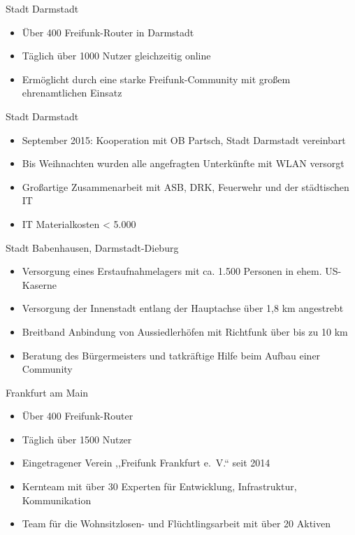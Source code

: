 \documentclass[t]{beamer}
\begin{document}
  \begin{frame}{Stadt Darmstadt}
    \begin{itemize}
      \item Über 400 Freifunk-Router in Darmstadt
      \item Täglich über 1000 Nutzer gleichzeitig online
      \item Ermöglicht durch eine starke Freifunk-Community mit großem ehrenamtlichen Einsatz
    \end{itemize}
  \end{frame}

  \begin{frame}{Stadt Darmstadt}
    \begin{itemize}
      \item September 2015: Kooperation mit OB Partsch, Stadt Darmstadt vereinbart
      \item Bis Weihnachten wurden alle angefragten Unterkünfte mit WLAN versorgt
      \item Großartige Zusammenarbeit mit ASB, DRK, Feuerwehr und der städtischen IT
      \item IT Materialkosten < 5.000 \texteuro
    \end{itemize}
  \end{frame}

  \begin{frame}{Stadt Babenhausen, Darmstadt-Dieburg}
    \begin{itemize}
      \item Versorgung eines Erstaufnahmelagers mit ca. 1.500 Personen in ehem. US-Kaserne
      \item Versorgung der Innenstadt entlang der Hauptachse über 1,8 km angestrebt
      \item Breitband Anbindung von Aussiedlerhöfen mit Richtfunk über bis zu 10 km
      \item Beratung des Bürgermeisters und tatkräftige Hilfe beim Aufbau einer Community
    \end{itemize}
  \end{frame}


  \begin{frame}{Frankfurt am Main}
    \begin{itemize}
      \item Über 400 Freifunk-Router
      \item Täglich über 1500 Nutzer
      \item Eingetragener Verein ,,Freifunk Frankfurt e.~V.`` seit 2014
      \item Kernteam mit über 30 Experten für Entwicklung, Infrastruktur, Kommunikation
      \item Team für die Wohnsitzlosen- und Flüchtlingsarbeit mit über 20 Aktiven
    \end{itemize}
  \end{frame}
\end{document}
